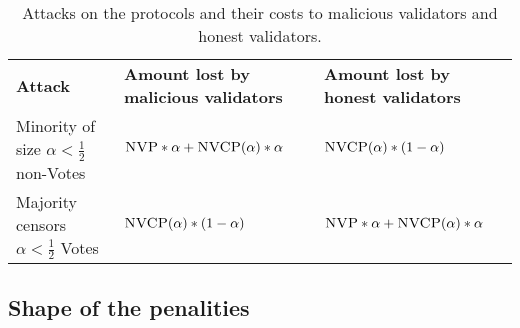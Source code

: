\documentclass[12pt, final]{article}
\newcommand{\NVP}{\textsc{NVP}\space}
\newcommand{\NVCP}{\textsc{NVCP}\space}
\begin{document}
\begin{table}
\centering
    \renewcommand{\arraystretch}{2}
    \begin{tabular}{l l l }
    \textbf{Attack} & \textbf{Amount lost by malicious validators}  & \textbf{Amount lost by honest validators} \\
    Minority of size $\alpha < \frac{1}{2}$ non-Votes & $\NVP * \alpha + \NVCP(\alpha) * \alpha$ & $\NVCP(\alpha) * (1-\alpha)$ \\
    Majority censors $\alpha < \frac{1}{2}$ Votes & $\NVCP(\alpha) * (1-\alpha)$ & $\NVP * \alpha + \NVCP(\alpha) * \alpha$ \\
    \end{tabular}
    \caption{Attacks on the protocols and their costs to malicious validators and honest validators.}
\end{table}

\subsection{Shape of the penalities}



%
%



\end{document}
